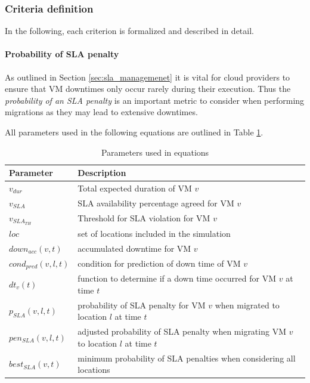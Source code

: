 \subsubsection{Criteria definition}

In the following, each criterion is formalized and described in detail. 

\paragraph{Probability of SLA penalty}

As outlined in Section \ref{sec:sla_managemenet} it is vital for cloud providers to ensure that VM downtimes only occur rarely during their execution. 
Thus the \textit{probability of an SLA penalty} is an important metric to consider when performing migrations as they may lead to extensive downtimes. 

All parameters used in the following equations are outlined in Table \ref{tab:sla_penalty_parameters}. 

\begin{table}[htbp]
\centering
\begin{tabular}{ll}
  \hline
	Parameter & Description	 \\
  \hline
	$v_{dur}$ & Total expected duration of VM $v$	 \\
	$v_{SLA}$ & SLA availability percentage agreed for VM $v$	 \\
	$v_{SLA_{TH}}$ & Threshold for SLA violation for VM $v$	 \\
	$loc$ & set of locations included in the simulation	 \\
	$down_{acc}(v,t)$ & accumulated downtime for VM $v$ \\
	$cond_{pred}(v,l,t)$ & condition for prediction of down time of VM $v$ \\
	$dt_{v}(t)$ & function to determine if a down time occurred for VM $v$ at time $t$	 \\
	$p_{SLA}(v,l,t)$ & probability of SLA penalty for VM $v$ when migrated to location $l$ at time $t$	 \\
	$pen_{SLA}(v,l,t)$ & adjusted probability of SLA penalty when migrating VM $v$ to location $l$ at time $t$	 \\
	$best_{SLA}(v,t)$ & minimum probability of SLA penalties when considering all locations \\
   \hline
\end{tabular}
\caption{Parameters used in equations}
\label{tab:sla_penalty_parameters}
\end{table}


